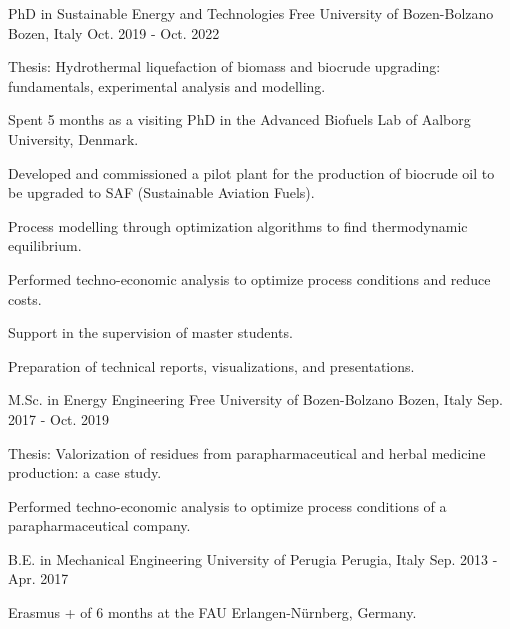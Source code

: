 

\begin{cventries}

  \cventry
  {PhD in Sustainable Energy and Technologies} %
  {Free University of Bozen-Bolzano} %
  {Bozen, Italy} %
  {Oct. 2019 - Oct. 2022} %
  {
    \begin{cvitems} %
      \item {Thesis: Hydrothermal liquefaction of biomass and biocrude upgrading: fundamentals, experimental analysis and modelling.}
      \item {Spent 5 months as a visiting PhD in the Advanced Biofuels Lab of Aalborg University, Denmark.}
      \item {Developed and commissioned a pilot plant for the production of biocrude oil to be upgraded to SAF (Sustainable Aviation Fuels).}
      \item {Process modelling through optimization algorithms to find thermodynamic equilibrium.}
      \item {Performed techno-economic analysis to optimize process conditions and reduce costs.}
      \item {Support in the supervision of master students.}
      \item {Preparation of technical reports, visualizations, and presentations.}
    \end{cvitems}
  }

  \cventry
  {M.Sc. in Energy Engineering} %
  {Free University of Bozen-Bolzano} %
  {Bozen, Italy} %
  {Sep. 2017 - Oct. 2019} %
  {
    \begin{cvitems} %
      \item {Thesis: Valorization of residues from parapharmaceutical and herbal medicine production: a case study.}
      \item {Performed techno-economic analysis to optimize process conditions of a parapharmaceutical company.}
    \end{cvitems}
  }

  \cventry
  {B.E. in Mechanical Engineering} %
  {University of Perugia} %
  {Perugia, Italy} %
  {Sep. 2013 - Apr. 2017} %
  {
    \begin{cvitems} %
      \item {Erasmus + of 6 months at the FAU Erlangen-Nürnberg, Germany.}
    \end{cvitems}
  }

\end{cventries}
